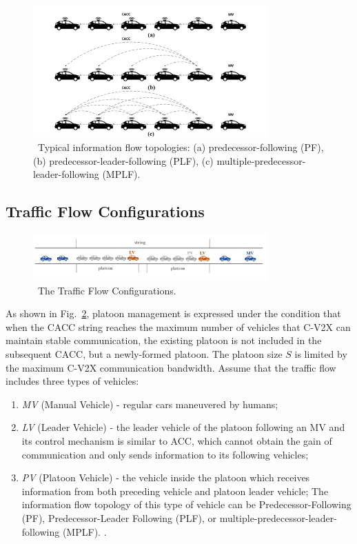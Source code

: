 \documentclass[journal]{IEEEtran}
\begin{document}
\begin{figure}
\centering
\includegraphics[width=9cm]{fig1.png}
\caption{~Typical information flow topologies: (a) predecessor-following (PF), (b) predecessor-leader-following (PLF), (c) multiple-predecessor-leader-following (MPLF).} 
\label{Figure1}
\end{figure}


\subsection{Traffic Flow Configurations}

\begin{figure}
\centering
\includegraphics[width=9cm]{fig2.png}
\caption{~The Traffic Flow Configurations.} 
\label{Figure2}
\end{figure}

As shown in Fig.~\ref{Figure2}, platoon management is expressed under the condition that when the CACC string reaches the maximum number of vehicles that C-V2X can maintain stable communication, the existing platoon is not included in the subsequent CACC, but a newly-formed platoon. The platoon size $S$ is limited by the maximum C-V2X communication bandwidth. Assume that the traffic flow includes three types of vehicles:


\begin{enumerate}
	\item \emph{MV} (Manual Vehicle) - regular cars maneuvered by humans;
	\item \emph{LV} (Leader Vehicle) - the leader vehicle of the platoon following an MV and its control mechanism is similar to ACC, which cannot obtain the gain of communication and only sends information to its following vehicles;\citep{zheng2014influence}
	\item \emph{PV} (Platoon Vehicle) - the vehicle inside the platoon which receives information from both preceding vehicle and platoon leader vehicle; The information flow topology of this type of vehicle can be Predecessor-Following (PF), Predecessor-Leader Following (PLF), or multiple-predecessor-leader-following (MPLF). \citep{zheng2014influence}.
\end{enumerate}
\end{document}
